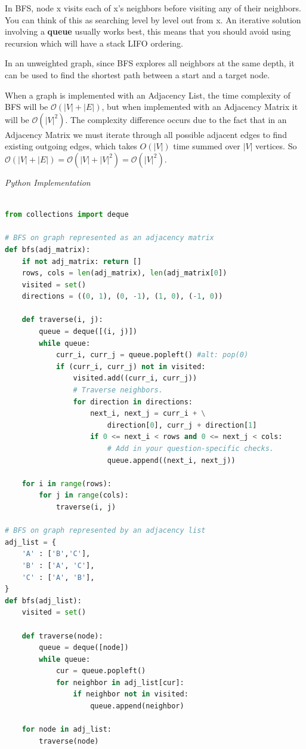 \documentclass{article}
\newcommand{\bigO}{\mathcal{O}}
\begin{document}
    In BFS, node x visits each of x's neighbors before visiting any of their neighbors. You can think of this as searching level by level out from x. An iterative solution involving a \textbf{queue} usually works best, this means that you should avoid using recursion which will have a stack LIFO ordering.
    
    In an unweighted graph, since BFS explores all neighbors at the same depth, it can be used to find the shortest path between a start and a target node.
    
    When a graph is implemented with an Adjacency List, the time complexity of BFS will be $\bigO(|V| + |E|)$, but when implemented with an Adjacency Matrix it will be $\bigO(|V|^2)$. The complexity difference occurs due to the fact that in an Adjacency Matrix we must iterate through all possible adjacent edges to find existing outgoing edges, which takes $O(|V|)$ time summed over $|V|$ vertices. So $\bigO(|V| + |E|) = \bigO(|V| + |V|^2) = \bigO(|V|^2)$.
    
\vspace{8pt} \emph{Python Implementation}
\begin{lstlisting}[language=Python]

from collections import deque

# BFS on graph represented as an adjacency matrix
def bfs(adj_matrix):
    if not adj_matrix: return []
    rows, cols = len(adj_matrix), len(adj_matrix[0])
    visited = set()
    directions = ((0, 1), (0, -1), (1, 0), (-1, 0))

    def traverse(i, j):
        queue = deque([(i, j)])
        while queue:
            curr_i, curr_j = queue.popleft() #alt: pop(0)
            if (curr_i, curr_j) not in visited:
                visited.add((curr_i, curr_j))
                # Traverse neighbors.
                for direction in directions:
                    next_i, next_j = curr_i + \
                        direction[0], curr_j + direction[1]
                    if 0 <= next_i < rows and 0 <= next_j < cols:
                        # Add in your question-specific checks.
                        queue.append((next_i, next_j))

    for i in range(rows):
        for j in range(cols):
            traverse(i, j)
            
# BFS on graph represented by an adjacency list 
adj_list = {
    'A' : ['B','C'],
    'B' : ['A', 'C'],
    'C' : ['A', 'B'],
}
def bfs(adj_list):
    visited = set()
    
    def traverse(node):
        queue = deque([node])
        while queue:
            cur = queue.popleft()
            for neighbor in adj_list[cur]:
                if neighbor not in visited:
                    queue.append(neighbor)
                    
    for node in adj_list:
        traverse(node)
\end{lstlisting}
\end{document}
